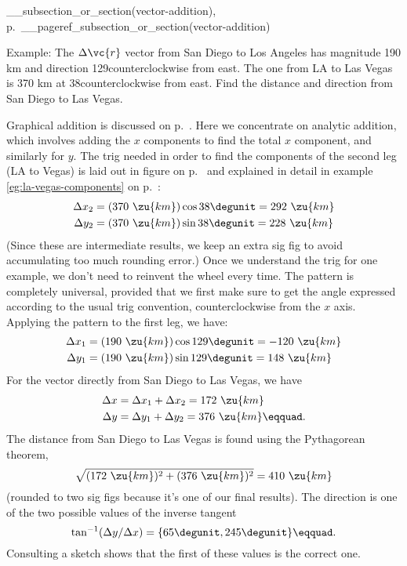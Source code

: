 __subsection_or_section(vector-addition), p.~__pageref_subsection_or_section(vector-addition)

Example:
The $\Delta\vc{r}$ vector from San Diego to Los Angeles has magnitude 190 km and direction 129\degunit counterclockwise from east.
The one from LA to Las Vegas is 370 km at 38\degunit counterclockwise from east. Find the distance and direction from
San Diego to Las Vegas.

\eganswer
Graphical addition is discussed on p.~\pageref{subsec:vector-addition-graphical}. Here we concentrate on analytic addition,
which involves adding the $x$ components to find the total $x$ component, and similarly for $y$. The trig needed in order
to find the components of the second leg (LA to Vegas) is laid out in figure  on p.~\pageref{fig:eg-la-vegas} and explained in detail
in example \ref{eg:la-vegas-components} on p.~\pageref{eg:la-vegas-components}:
\begin{align*}
  \Delta x_2 &= (370\ \zu{km})\cos 38\degunit = 292\ \zu{km} \\
  \Delta y_2 &= (370\ \zu{km})\sin 38\degunit = 228\ \zu{km} 
\end{align*}
(Since these are intermediate results, we keep an extra sig fig to avoid accumulating too much rounding error.)
Once we understand the trig for one example, we don't need to reinvent the wheel every time. The pattern is completely universal,
provided that we first make sure to get the angle expressed according to the usual trig convention, counterclockwise from the $x$ axis.
Applying the pattern to the first leg, we have:
\begin{align*}
  \Delta x_1 &= (190\ \zu{km})\cos 129\degunit = -120\ \zu{km} \\
  \Delta y_1 &= (190\ \zu{km})\sin 129\degunit = 148\ \zu{km} 
\end{align*}
For the vector directly from San Diego to Las Vegas, we have
\begin{align*}
  \Delta x &= \Delta x_1 +  \Delta x_2 = 172\ \zu{km}\\
  \Delta y &= \Delta y_1 +  \Delta y_2 = 376\ \zu{km}\eqquad.
\end{align*}
The distance from San Diego to Las Vegas is found using the Pythagorean theorem,
\begin{equation*}
  \sqrt{(172\ \zu{km})^2+(376\ \zu{km})^2} = 410\ \zu{km}
\end{equation*}
(rounded to two sig figs because it's one of our final results). The direction
is one of the two possible values of the inverse tangent
\begin{equation*}
  \tan^{-1} (\Delta y/\Delta x) = \{65\degunit,245\degunit\}\eqquad.
\end{equation*}
Consulting a sketch shows that the first of these values is the correct one.\label{end-skills}
